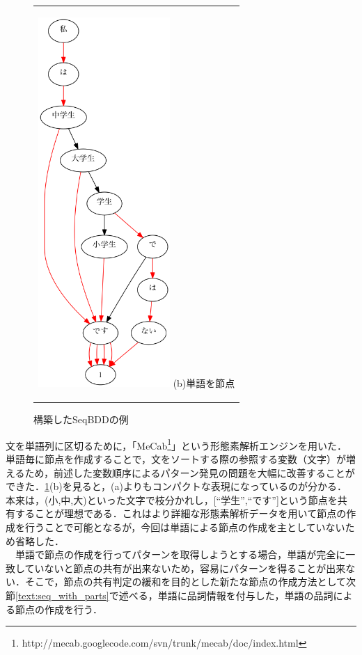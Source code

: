 \documentclass[12pt,twoside, fleqn]{ujbook}
\begin{document}
\begin{figure}[htbp]
\begin{center}
\begin{tabular}{c}
		\begin{minipage}{0.4\hsize}
			\begin{center}
			\includegraphics [clip, width=5cm]{./img/example_graph_word2.png}
			\hspace{1.6cm} (b)単語を節点
			\end{center}
		\end{minipage}
	\end{tabular}
	\caption{構築したSeqBDDの例}
	\label{fig:seqbdd_graph1}
	\end{center}
	\end{figure}

	\newpage
	文を単語列に区切るために，「MeCab\footnote{http://mecab.googlecode.com/svn/trunk/mecab/doc/index.html}」という形態素解析エンジンを用いた．単語毎に節点を作成することで，文をソートする際の参照する変数（文字）が増えるため，前述した変数順序によるパターン発見の問題を大幅に改善することができた．\ref{fig:seqbdd_graph1}(b)を見ると，(a)よりもコンパクトな表現になっているのが分かる．本来は，(小,中,大)といった文字で枝分かれし，[``学生'',``です'']という節点を共有することが理想である．これはより詳細な形態素解析データを用いて節点の作成を行うことで可能となるが，今回は単語による節点の作成を主としていないため省略した．\\
	　単語で節点の作成を行ってパターンを取得しようとする場合，単語が完全に一致していないと節点の共有が出来ないため，容易にパターンを得ることが出来ない．そこで，節点の共有判定の緩和を目的とした新たな節点の作成方法として次節\ref{text:seq_with_parts}で述べる，単語に品詞情報を付与した，単語の品詞による節点の作成を行う．
\end{document}
